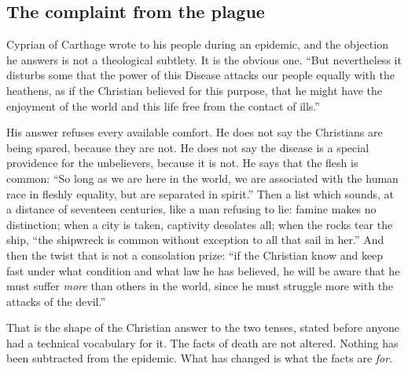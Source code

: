 \subsection{The complaint from the plague}

Cyprian of Carthage wrote to his people during an epidemic, and the objection he answers is not a theological subtlety. It is the obvious one. ``But nevertheless it disturbs some that the power of this Disease attacks our people equally with the heathens, as if the Christian believed for this purpose, that he might have the enjoyment of the world and this life free from the contact of ills.''

His answer refuses every available comfort. He does not say the Christians are being spared, because they are not. He does not say the disease is a special providence for the unbelievers, because it is not. He says that the flesh is common: ``So long as we are here in the world, we are associated with the human race in fleshly equality, but are separated in spirit.'' Then a list which sounds, at a distance of seventeen centuries, like a man refusing to lie: famine makes no distinction; when a city is taken, captivity desolates all; when the rocks tear the ship, ``the shipwreck is common without exception to all that sail in her.'' And then the twist that is not a consolation prize: ``if the Christian know and keep fast under what condition and what law he has believed, he will be aware that he must suffer \emph{more} than others in the world, since he must struggle more with the attacks of the devil.''

That is the shape of the Christian answer to the two tenses, stated before anyone had a technical vocabulary for it. The facts of death are not altered. Nothing has been subtracted from the epidemic. What has changed is what the facts are \emph{for}.

